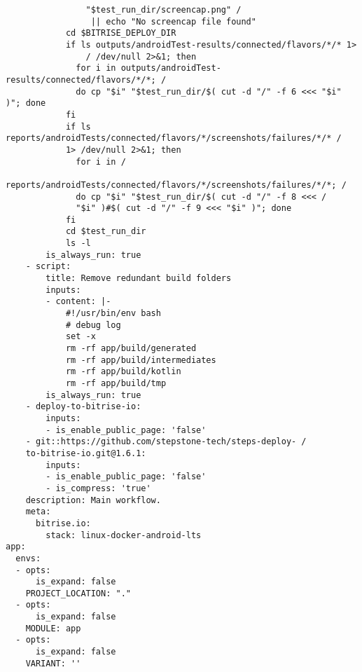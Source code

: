 \begin{verbatim}
                "$test_run_dir/screencap.png" /
                 || echo "No screencap file found"
            cd $BITRISE_DEPLOY_DIR
            if ls outputs/androidTest-results/connected/flavors/*/* 1>
                / /dev/null 2>&1; then
              for i in outputs/androidTest-results/connected/flavors/*/*; /
              do cp "$i" "$test_run_dir/$( cut -d "/" -f 6 <<< "$i" )"; done
            fi
            if ls reports/androidTests/connected/flavors/*/screenshots/failures/*/* /
            1> /dev/null 2>&1; then
              for i in /
              reports/androidTests/connected/flavors/*/screenshots/failures/*/*; / 
              do cp "$i" "$test_run_dir/$( cut -d "/" -f 8 <<< /
              "$i" )#$( cut -d "/" -f 9 <<< "$i" )"; done
            fi
            cd $test_run_dir
            ls -l
        is_always_run: true
    - script:
        title: Remove redundant build folders
        inputs:
        - content: |-
            #!/usr/bin/env bash
            # debug log
            set -x
            rm -rf app/build/generated
            rm -rf app/build/intermediates
            rm -rf app/build/kotlin
            rm -rf app/build/tmp
        is_always_run: true
    - deploy-to-bitrise-io:
        inputs:
        - is_enable_public_page: 'false'
    - git::https://github.com/stepstone-tech/steps-deploy- /
    to-bitrise-io.git@1.6.1:
        inputs:
        - is_enable_public_page: 'false'
        - is_compress: 'true'
    description: Main workflow.
    meta:
      bitrise.io:
        stack: linux-docker-android-lts
app:
  envs:
  - opts:
      is_expand: false
    PROJECT_LOCATION: "."
  - opts:
      is_expand: false
    MODULE: app
  - opts:
      is_expand: false
    VARIANT: ''
\end{verbatim}